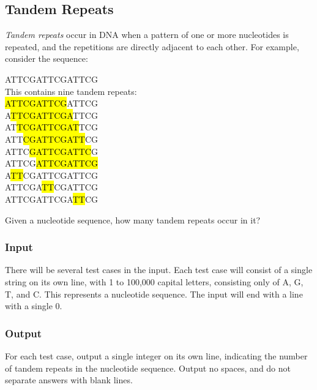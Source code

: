 \subsection{Tandem Repeats\cite{acmsoutheastregional2013}}
\textit{Tandem repeats} occur in DNA when a pattern of one or more nucleotides is repeated, and the repetitions are directly adjacent to each other.
For example, consider the sequence:
\begin{center}
	ATTCGATTCGATTCG\\
	This contains nine tandem repeats:\\
	\hl{ATTCGATTCG}ATTCG\\
	A\hl{TTCGATTCGA}TTCG\\
	AT\hl{TCGATTCGAT}TCG\\
	ATT\hl{CGATTCGATT}CG\\
	ATTC\hl{GATTCGATTC}G\\
	ATTCG\hl{ATTCGATTCG}\\
	A\hl{TT}CGATTCGATTCG\\
	ATTCGA\hl{TT}CGATTCG\\
	ATTCGATTCGA\hl{TT}CG\\
\end{center}

Given a nucleotide sequence, how many tandem repeats occur in it?

\subsubsection{Input}
There will be several test cases in the input.
Each test case will consist of a single string on its own line, with 1 to 100,000 capital letters, consisting only of A, G, T, and C.
This represents a nucleotide sequence.
The input will end with a line with a single 0.

\subsubsection{Output}
For each test case, output a single integer on its own line, indicating the number of tandem repeats in the nucleotide sequence.
Output no spaces, and do not separate answers with blank lines.

